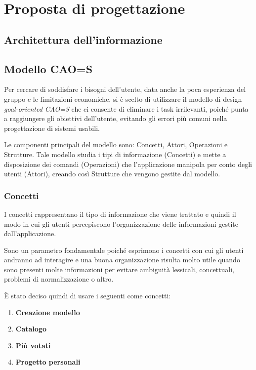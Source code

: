 \documentclass[12pt,italian,]{report}
\providecommand{\tightlist}{%
  \setlength{\itemsep}{0pt}\setlength{\parskip}{0pt}}
\begin{document}
\hypertarget{proposta-di-progettazione}{%
\chapter{Proposta di progettazione}\label{proposta-di-progettazione}}

\hypertarget{architettura-dellinformazione}{%
\section{Architettura
dell'informazione}\label{architettura-dellinformazione}}

\hypertarget{modello-caos}{%
\section{Modello CAO=S}\label{modello-caos}}

Per cercare di soddisfare i bisogni dell'utente, data anche la poca
esperienza del gruppo e le limitazioni economiche, si è scelto di
utilizzare il modello di design \emph{goal-oriented CAO=S} che ci
consente di eliminare i task irrilevanti, poiché punta a raggiungere gli
obiettivi dell'utente, evitando gli errori più comuni nella
progettazione di sistemi usabili.

Le componenti principali del modello sono: Concetti, Attori,
Operazioni e Strutture. Tale modello studia i tipi di informazione
(Concetti) e mette a disposizione dei comandi (Operazioni) che
l'applicazione manipola per conto degli utenti (Attori), creando così
Strutture che vengono gestite dal modello.

\hypertarget{concetti}{%
\subsection{Concetti}\label{concetti}}

I concetti rappresentano il tipo di informazione che viene trattato e
quindi il modo in cui gli utenti percepiscono l'organizzazione delle
informazioni gestite dall'applicazione.

Sono un parametro fondamentale poiché esprimono i concetti con cui gli
utenti andranno ad interagire e una buona organizzazione risulta molto
utile quando sono presenti molte informazioni per evitare ambiguità
lessicali, concettuali, problemi di normalizzazione o altro.

È stato deciso quindi di usare i seguenti come concetti:

\begin{enumerate}
\def\labelenumi{\arabic{enumi}.}
\tightlist
\item
  \textbf{Creazione modello}
\item
  \textbf{Catalogo}
\item
  \textbf{Più votati}
\item
  \textbf{Progetto personali}
\end{enumerate}
\end{document}
